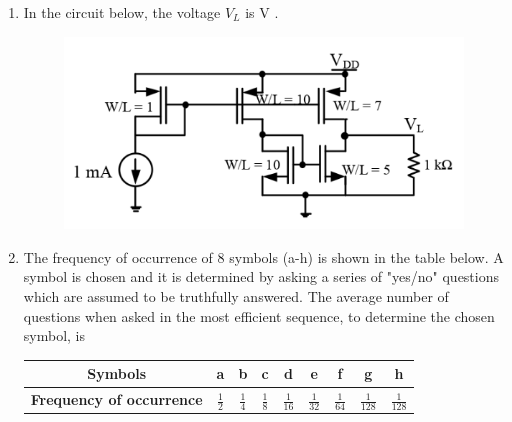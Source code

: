 \documentclass[a4paper, 11pt]{article}
\begin{document}
\begin{enumerate}
    \hfill{}
    
    \item In the circuit below, the voltage $V_L$ is \underline{\hspace{2cm}} V .
    \begin{figure}[H]
        \centering
        \includegraphics[width=0.6\columnwidth]{figs/Q54.png}
        \caption*{}
        \label{fig:q64}
    \end{figure}
    
    \hfill{}
    
    \item The frequency of occurrence of 8 symbols (a-h) is shown in the table below. A symbol is chosen and it is determined by asking a series of "yes/no" questions which are assumed to be truthfully answered. The average number of questions when asked in the most efficient sequence, to determine the chosen symbol, is \underline{\hspace{2cm}} 
    \begin{table}[H]
        \centering
        \begin{tabular}{|c|c|c|c|c|c|c|c|c|}
            \hline
            \textbf{Symbols} & a & b & c & d & e & f & g & h \\
            \hline
            \textbf{Frequency of occurrence} & $\frac{1}{2}$ & $\frac{1}{4}$ & $\frac{1}{8}$ & $\frac{1}{16}$ & $\frac{1}{32}$ & $\frac{1}{64}$ & $\frac{1}{128}$ & $\frac{1}{128}$ \\
            \hline
        \end{tabular}
    \end{table}
    \hfill{}

\end{enumerate}
\end{document}

